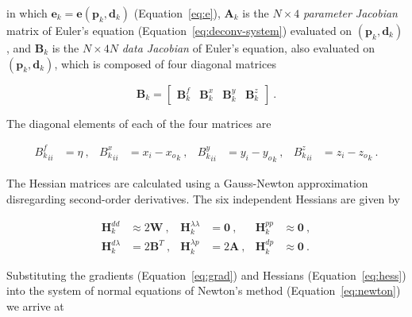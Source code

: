 \noindent
in which $\mathbf{e}_k = \mathbf{e}(\mathbf{p}_k,\mathbf{d}_k)$
(Equation~\ref{eq:e}), $\mathbf{A}_k$ is the $N \times 4$ \textit{parameter
Jacobian} matrix of Euler's equation (Equation~\ref{eq:deconv-system})
evaluated on $(\mathbf{p}_k,\mathbf{d}_k)$, and $\mathbf{B}_k$ is the $N \times
4N$ \textit{data Jacobian} of Euler's equation, also evaluated on
$(\mathbf{p}_k,\mathbf{d}_k)$, which is composed of four diagonal matrices

\begin{equation}
  \mathbf{B}_k =
  \begin{bmatrix}
    \mathbf{B}^f_k &
    \mathbf{B}^x_k &
    \mathbf{B}^y_k &
    \mathbf{B}^z_k
  \end{bmatrix}
  \ .
  \label{eq:B}
\end{equation}

\noindent
The diagonal elements of each of the four matrices are

\begin{equation}
  \begin{aligned}
    {B^f_k}_{ii} &= \eta \ , &
    {B^x_k}_{ii} &= x_i - {x_o}_k \ , &
    {B^y_k}_{ii} &= y_i - {y_o}_k \ , &
    {B^z_k}_{ii} &= z_i - {z_o}_k \ .
  \end{aligned}
\end{equation}

The Hessian matrices are calculated using a Gauss-Newton approximation
disregarding second-order derivatives. The six independent Hessians are given
by

\begin{equation}
  \begin{aligned}
    \mathbf{H}^{dd}_k &\approx 2\mathbf{W} \ , &
    \mathbf{H}^{\lambda\lambda}_k &= \mathbf{0} \ , &
    \mathbf{H}^{pp}_k &\approx \mathbf{0} \ ,
    \\
    \mathbf{H}^{d\lambda}_k &= 2\mathbf{B}^T \ , &
    \mathbf{H}^{\lambda p}_k &= 2\mathbf{A} \ , &
    \mathbf{H}^{dp}_k &\approx \mathbf{0} \ .
  \end{aligned}
  \label{eq:hess}
\end{equation}

\noindent
Substituting the gradients (Equation~\ref{eq:grad}) and Hessians
(Equation~\ref{eq:hess}) into the system of normal equations of Newton's method
(Equation~\ref{eq:newton}) we arrive at

